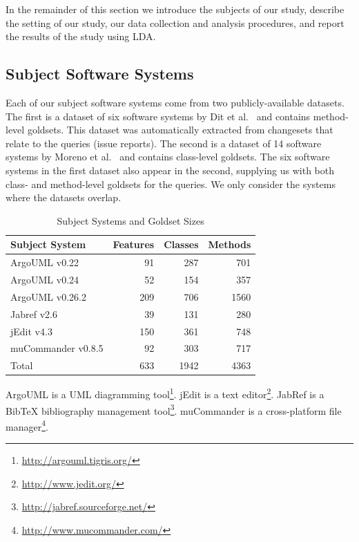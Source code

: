 In the remainder of this section we introduce the subjects of our study,
describe the setting of our study, our data collection and analysis procedures,
and report the results of the study using LDA.


\subsection{Subject Software Systems}

Each of our subject software systems come from two publicly-available datasets.
The first is a dataset of six software systems by Dit et
al.~\cite{Dit-etal_2013} and contains method-level goldsets.  This dataset was
automatically extracted from changesets that relate to the queries (issue
reports). The second is a dataset of 14 software systems by Moreno et
al.~\cite{Moreno-etal_2014} and contains class-level goldsets.  The six software
systems in the first dataset also appear in the second, supplying us with both
class- and method-level goldsets for the queries.  We only consider the systems
where the datasets overlap.

\begin{table}[t]
\vspace{2mm}
\renewcommand{\arraystretch}{1.3}
\centering
\caption{Subject Systems and Goldset Sizes}
\begin{tabular}{lrrr}
    \toprule
    Subject System     & Features & Classes & Methods \\
    \midrule
    ArgoUML v0.22      & 91       & 287     & 701     \\
    ArgoUML v0.24      & 52       & 154     & 357     \\
    ArgoUML v0.26.2    & 209      & 706     & 1560    \\
    Jabref v2.6        & 39       & 131     & 280     \\
    jEdit v4.3         & 150      & 361     & 748     \\
    muCommander v0.8.5 & 92       & 303     & 717     \\
    \midrule
    Total              & 633      & 1942    & 4363    \\
    \bottomrule
\end{tabular}
\label{table:subjects}
\end{table}


ArgoUML is a UML diagramming tool\footnote{\url{http://argouml.tigris.org/}}.
jEdit is a text editor\footnote{\url{http://www.jedit.org/}}.
JabRef is a BibTeX bibliography management tool\footnote{\url{http://jabref.sourceforge.net/}}.
muCommander is a cross-platform file manager\footnote{\url{http://www.mucommander.com/}}.



